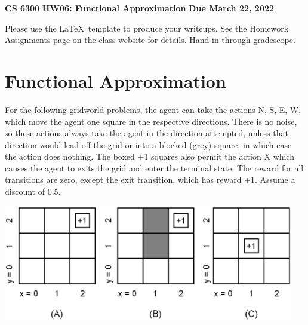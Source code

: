 \documentclass[12pt]{article}
\begin{document}
\begin{center} 
{\bf CS 6300} \hfill {\large\bf HW06: Functional Approximation} \hfill {\bf Due March 22, 2022}
\end{center}

\noindent
Please use the \LaTeX\ template to produce your writeups. See the
Homework Assignments page on the class website for details.  Hand in
through gradescope.

\section{Functional Approximation}

For the following gridworld problems, the agent can take the actions
N, S, E, W, which move the agent one square in the respective
directions. There is no noise, so these actions always take the agent
in the direction attempted, unless that direction would lead off the
grid or into a blocked (grey) square, in which case the action does
nothing. The boxed +1 squares also permit the action X which causes
the agent to exits the grid and enter the terminal state. The reward
for all transitions are zero, except the exit transition, which has
reward +1. Assume a discount of 0.5.

\begin{center}
\includegraphics[width=5in]{3grid.eps}
\end{center}
\end{document}
